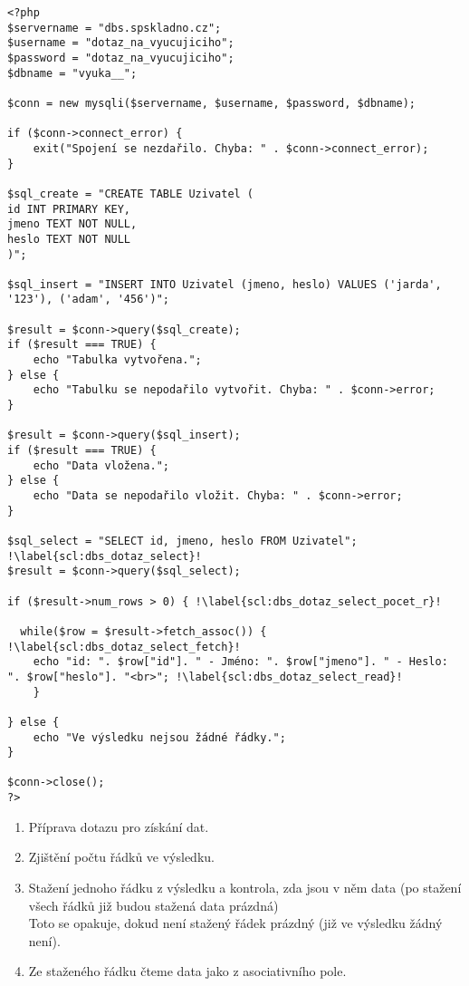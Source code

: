 \begin{minipage}[t]{.45\textwidth}
\begin{code}
\begin{verbatim}
<?php
$servername = "dbs.spskladno.cz"; 
$username = "dotaz_na_vyucujiciho";
$password = "dotaz_na_vyucujiciho";
$dbname = "vyuka__";

$conn = new mysqli($servername, $username, $password, $dbname); 

if ($conn->connect_error) { 
    exit("Spojení se nezdařilo. Chyba: " . $conn->connect_error);
}

$sql_create = "CREATE TABLE Uzivatel ( 
id INT PRIMARY KEY,
jmeno TEXT NOT NULL,
heslo TEXT NOT NULL
)";

$sql_insert = "INSERT INTO Uzivatel (jmeno, heslo) VALUES ('jarda', '123'), ('adam', '456')"; 

$result = $conn->query($sql_create);
if ($result === TRUE) {
    echo "Tabulka vytvořena.";
} else {
    echo "Tabulku se nepodařilo vytvořit. Chyba: " . $conn->error;
}

$result = $conn->query($sql_insert); 
if ($result === TRUE) {	
    echo "Data vložena.";
} else {
    echo "Data se nepodařilo vložit. Chyba: " . $conn->error;
}

$sql_select = "SELECT id, jmeno, heslo FROM Uzivatel"; !\label{scl:dbs_dotaz_select}!
$result = $conn->query($sql_select);

if ($result->num_rows > 0) { !\label{scl:dbs_dotaz_select_pocet_r}!

  while($row = $result->fetch_assoc()) { !\label{scl:dbs_dotaz_select_fetch}!
    echo "id: ". $row["id"]. " - Jméno: ". $row["jmeno"]. " - Heslo: ". $row["heslo"]. "<br>"; !\label{scl:dbs_dotaz_select_read}!
    }
    
} else {
    echo "Ve výsledku nejsou žádné řádky.";
}

$conn->close();
?> 
\end{verbatim}

\label{code:php_dbs_select}
\end{code}
\end{minipage}
\begin{minipage}[t]{.45\textwidth}
\begin{enumerate}
\item[ř. \ref{scl:dbs_dotaz_select}:] Příprava dotazu pro získání dat.
\item[ř. \ref{scl:dbs_dotaz_select_pocet_r}:] Zjištění počtu řádků ve výsledku.
\vspace{3cm}
\item[ř. \ref{scl:dbs_dotaz_select_fetch}:] Stažení jednoho řádku z výsledku a kontrola, zda jsou v něm data (po stažení všech řádků již budou stažená data prázdná)\\
Toto se opakuje, dokud není stažený řádek prázdný (již ve výsledku žádný není).
\vspace{1.2cm}
\item[ř. \ref{scl:dbs_dotaz_select_read}:] Ze staženého řádku čteme data jako z asociativního pole. 
\end{enumerate}
\end{minipage}

